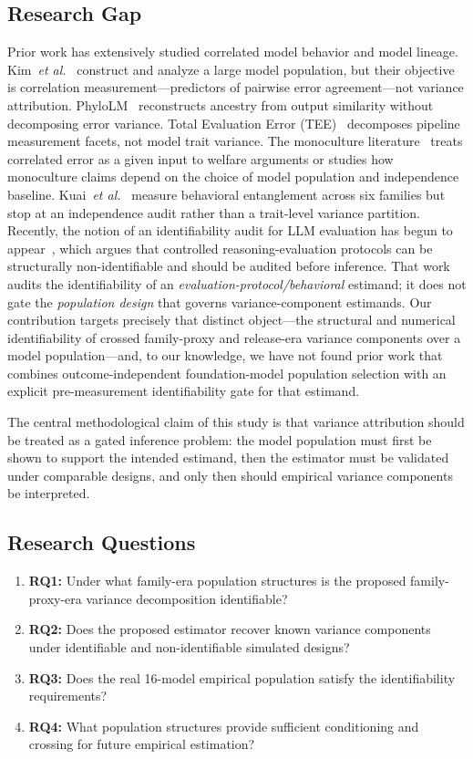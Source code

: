 \documentclass{ieeeaccess}
\theoremstyle{definition}
\theoremstyle{plain}
\begin{document}
\subsection{Research Gap}
Prior work has extensively studied correlated model behavior and model lineage. Kim~\textit{et al.}~\cite{kim2025} construct and analyze a large model population, but their objective is correlation measurement---predictors of pairwise error agreement---not variance attribution. PhyloLM~\cite{phylolm2024} reconstructs ancestry from output similarity without decomposing error variance. Total Evaluation Error (TEE)~\cite{messing2026} decomposes pipeline measurement facets, not model trait variance. The monoculture literature~\cite{kleinberg2021,bommasani2022,jo2026} treats correlated error as a given input to welfare arguments or studies how monoculture claims depend on the choice of model population and independence baseline. Kuai~\textit{et al.}~\cite{kuai2026} measure behavioral entanglement across six families but stop at an independence audit rather than a trait-level variance partition. Recently, the notion of an identifiability audit for LLM evaluation has begun to appear~\cite{identaudit2026}, which argues that controlled reasoning-evaluation protocols can be structurally non-identifiable and should be audited before inference. That work audits the identifiability of an \emph{evaluation-protocol/behavioral} estimand; it does not gate the \emph{population design} that governs variance-component estimands. Our contribution targets precisely that distinct object---the structural and numerical identifiability of crossed family-proxy and release-era variance components over a model population---and, to our knowledge, we have not found prior work that combines outcome-independent foundation-model population selection with an explicit pre-measurement identifiability gate for that estimand.

The central methodological claim of this study is that variance attribution should be treated as a gated inference problem: the model population must first be shown to support the intended estimand, then the estimator must be validated under comparable designs, and only then should empirical variance components be interpreted.

\subsection{Research Questions}
\begin{enumerate}
\item \textbf{RQ1:} Under what family-era population structures is the proposed family-proxy-era variance decomposition identifiable?
\item \textbf{RQ2:} Does the proposed estimator recover known variance components under identifiable and non-identifiable simulated designs?
\item \textbf{RQ3:} Does the real 16-model empirical population satisfy the identifiability requirements?
\item \textbf{RQ4:} What population structures provide sufficient conditioning and crossing for future empirical estimation?
\end{enumerate}
\end{document}
